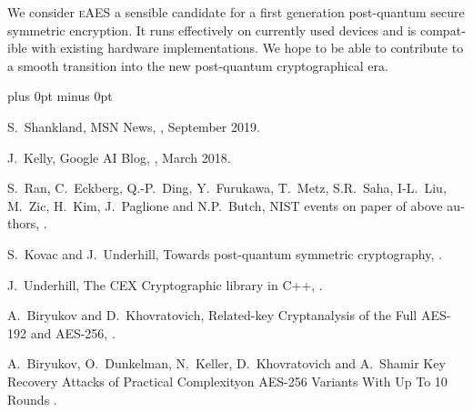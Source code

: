 \documentclass[a4paper,11pt]{article}
\begin{document}
\begin{otherlanguage}{english}
\noindent
We consider \textsc{eAES} a sensible candidate for a first generation post-quantum secure symmetric encryption. It runs effectively on currently used devices and is compatible with existing hardware implementations. We hope to be able to contribute to a smooth transition into the new post-quantum cryptographical era.


\vspace{2cm}



\begin{thebibliography}{1}
\itemsep=0cm plus 0pt minus 0pt

  S.~Shankland,
  \newblock MSN News,
  , September 2019.

  J.~Kelly,
  \newblock Google AI Blog,
  , March 2018.

  S.~Ran, C.~Eckberg, Q.-P.~Ding, Y.~Furukawa, T.~Metz, S.R.~Saha, I-L.~Liu, M.~Zic, H.~Kim, J.~Paglione and N.P.~Butch,
  \newblock NIST events on paper of above authors,
  .

S.~Kovac and J.~Underhill,
\newblock Towards post-quantum symmetric cryptography,
.

J.~Underhill,
\newblock The CEX Cryptographic library in C++,
.

A.~Biryukov and D.~Khovratovich,
\newblock Related-key Cryptanalysis of the Full AES-192 and AES-256,
.

A.~Biryukov, O.~Dunkelman, N.~Keller, D.~Khovratovich and A.~Shamir
\newblock Key Recovery Attacks of Practical Complexityon AES-256 Variants With Up To 10 Rounds
.


\end{thebibliography}
\end{otherlanguage}
\end{document}
